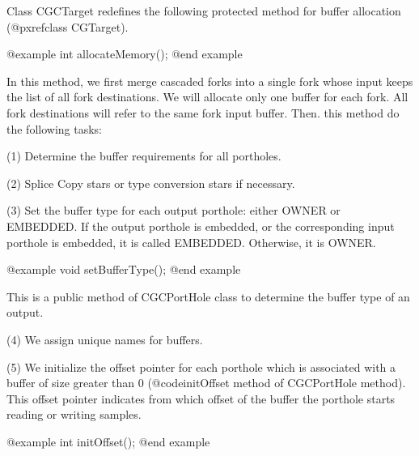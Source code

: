 Class CGCTarget redefines the
following protected method for buffer allocation (@pxref{class CGTarget}).

@example
int allocateMemory();
@end example

In this method, we first merge cascaded forks into a single fork whose
input keeps the list of all fork destinations. We will allocate only one
buffer for each fork. All fork destinations will refer to the same
fork input buffer. Then. this method do the following tasks:

(1) Determine the buffer requirements for all portholes.

(2) Splice Copy stars or type conversion stars if necessary.

(3) Set the buffer type for each output porthole: either OWNER or EMBEDDED.
If the output porthole is embedded, or the corresponding input porthole is
embedded, it is called EMBEDDED. Otherwise, it is OWNER.

@example
void setBufferType();
@end example

This is a public method of CGCPortHole class to determine the buffer type of
an output.

(4) We assign unique names for buffers.

(5) We initialize the offset pointer for each porthole which is associated
with a buffer of size greater than 0 (@code{initOffset} method of CGCPortHole
method). This offset pointer indicates from which offset of the buffer the
porthole starts reading or writing samples.

@example
int initOffset();
@end example


